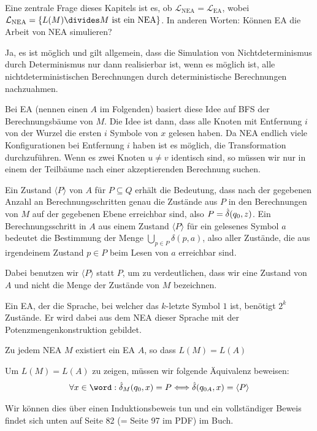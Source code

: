 Eine zentrale Frage dieses Kapitels ist es, ob $\mathcal{L}_{\text{NEA}} = \mathcal{L}_{\text{EA}}$, wobei $\mathcal{L}_{\text{NEA}} = \{ L(M) \divides M \text{ ist ein NEA} \}$.
In anderen Worten: Können EA die Arbeit von NEA simulieren?

Ja, es ist möglich und gilt allgemein, dass die Simulation von Nichtdeterminismus durch Determinismus nur dann realisierbar ist,
wenn es möglich ist, alle nichtdeterministischen Berechnungen durch deterministische Berechnungen nachzuahmen.

Bei EA (nennen einen $A$ im Folgenden) basiert diese Idee auf BFS der Berechnungsbäume von $M$.
Die Idee ist dann, dass alle Knoten mit Entfernung $i$ von der Wurzel die ersten $i$ Symbole von $x$ gelesen haben.
Da NEA endlich viele Konfigurationen bei Entfernung $i$ haben ist es möglich, die Transformation durchzuführen.
Wenn es zwei Knoten $u \neq v$ identisch sind, so müssen wir nur in einem der Teilbäume nach einer akzeptierenden Berechnung suchen.

 Ein Zustand $\langle P \rangle$ von $A$ für $P \subseteq Q$ erhält die Bedeutung,
dass nach der gegebenen Anzahl an Berechnungsschritten genau die Zustände aus $P$ in den Berechnungen von $M$ auf der gegebenen Ebene erreichbar sind, also $P = \hat{\delta}(q_0, z)$.
Ein Berechnungsschritt in $A$ aus einem Zustand $\langle P \rangle$ für ein gelesenes Symbol $a$ bedeutet die Bestimmung der Menge $\bigcup_{p \in P} \delta(p, a)$,
also aller Zustände, die aus irgendeinem Zustand $p \in P$ beim Lesen von $a$ erreichbar sind.

Dabei benutzen wir $\langle P \rangle$ statt $P$, um zu verdeutlichen, dass wir eine Zustand von $A$ und nicht die Menge der Zustände von $M$ bezeichnen.

Ein EA, der die Sprache, bei welcher das $k$-letzte Symbol $1$ ist, benötigt $2^k$ Zustände.
Er wird dabei aus dem NEA dieser Sprache mit der Potenzmengenkonstruktion gebildet.

\inlinetheorem Zu jedem NEA $M$ existiert ein EA $A$, so dass $L(M) = L(A)$

Um $L(M) = L(A)$ zu zeigen, müssen wir folgende Äquivalenz beweisen:
\rmvspace
\begin{align*}
    \forall x \in \word : \hdelta_M(q_0, x) = P \Longleftrightarrow \hdelta(q_{0 A}, x) = \langle P \rangle
\end{align*}

\rmvspace
Wir können dies über einen Induktionsbeweis tun und ein vollständiger Beweis findet sich unten auf Seite 82 (= Seite 97 im PDF) im Buch.

